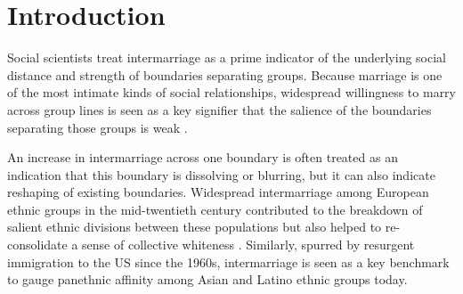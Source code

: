 \documentclass[11pt,]{article}
\newlength{\normalparindent}
\begin{document}
\vskip 6.5pt

\noindent \newpage\doublespacing\raggedright\setlength{\parindent}{\normalparindent} \hypertarget{introduction}{%
\section{Introduction}\label{introduction}}

Social scientists treat intermarriage as a prime indicator of the underlying social distance and strength of boundaries separating groups. Because marriage is one of the most intimate kinds of social relationships, widespread willingness to marry across group lines is seen as a key signifier that the salience of the boundaries separating those groups is weak \citep{gordon_assimilation_1964}.

An increase in intermarriage across one boundary is often treated as an indication that this boundary is dissolving or blurring, but it can also indicate reshaping of existing boundaries. Widespread intermarriage among European ethnic groups in the mid-twentieth century contributed to the breakdown of salient ethnic divisions between these populations but also helped to re-consolidate a sense of collective whiteness \citep{lieberson_many_1988, alba_ethnic_1990, jacobsen_whiteness_1998}. Similarly, spurred by resurgent immigration to the US since the 1960s, intermarriage is seen as a key benchmark to gauge panethnic affinity among Asian and Latino ethnic groups today.
\end{document}
